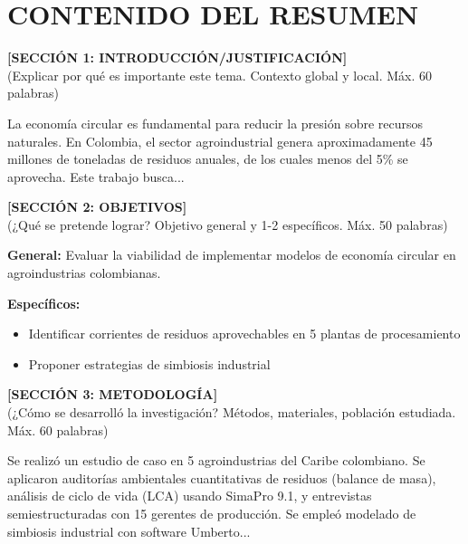 \documentclass[12pt,a4paper]{article}
\begin{document}
\newpage

\section*{CONTENIDO DEL RESUMEN}

\vspace{1cm}

\noindent
\textbf{[SECCIÓN 1: INTRODUCCIÓN/JUSTIFICACIÓN]}\\
(Explicar por qué es importante este tema. Contexto global y local. Máx. 60 palabras)

\vspace{0.3cm}

La economía circular es fundamental para reducir la presión sobre recursos naturales. En Colombia, el sector agroindustrial genera aproximadamente 45 millones de toneladas de residuos anuales, de los cuales menos del 5\% se aprovecha. Este trabajo busca...

\vspace{0.8cm}

\noindent
\textbf{[SECCIÓN 2: OBJETIVOS]}\\
(¿Qué se pretende lograr? Objetivo general y 1-2 específicos. Máx. 50 palabras)

\vspace{0.3cm}

\textbf{General:} Evaluar la viabilidad de implementar modelos de economía circular en agroindustrias colombianas.

\textbf{Específicos:}
\begin{itemize}
  \item Identificar corrientes de residuos aprovechables en 5 plantas de procesamiento
  \item Proponer estrategias de simbiosis industrial
\end{itemize}

\vspace{0.8cm}

\noindent
\textbf{[SECCIÓN 3: METODOLOGÍA]}\\
(¿Cómo se desarrolló la investigación? Métodos, materiales, población estudiada. Máx. 60 palabras)

\vspace{0.3cm}

Se realizó un estudio de caso en 5 agroindustrias del Caribe colombiano. Se aplicaron auditorías ambientales cuantitativas de residuos (balance de masa), análisis de ciclo de vida (LCA) usando SimaPro 9.1, y entrevistas semiestructuradas con 15 gerentes de producción. Se empleó modelado de simbiosis industrial con software Umberto...
\end{document}

